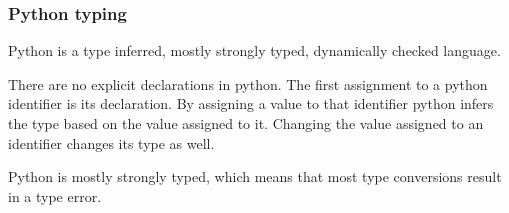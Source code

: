\begin{Shaded}
\begin{Highlighting}[]
\end{Highlighting}
\end{Shaded}

\subsubsection{Python
typing}\label{python-introduction.md__python-typing}

Python is a type inferred, mostly strongly typed, dynamically checked
language.

There are no explicit declarations in python. The first assignment to a
python identifier is its declaration. By assigning a value to that
identifier python infers the type based on the value assigned to it.
Changing the value assigned to an identifier changes its type as well.

\begin{Shaded}
\begin{Highlighting}[]
\OperatorTok{=} 
\NormalTok{(}
\OperatorTok{=} 
\NormalTok{(}
\end{Highlighting}
\end{Shaded}

\begin{Shaded}
\begin{Highlighting}[]
\OperatorTok{\textless{}} \OperatorTok{\textgreater{}}
\OperatorTok{\textless{}} \OperatorTok{\textgreater{}}
\end{Highlighting}
\end{Shaded}

Python is mostly strongly typed, which means that most type conversions
result in a type error.

